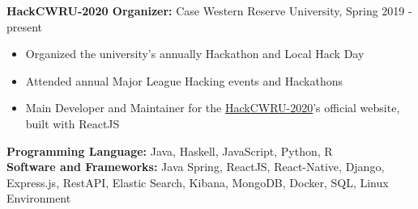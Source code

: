 \documentclass[a4paper,11pt]{article}
\begin{document}
\begin{flushleft}
	
	\textbf{HackCWRU-2020 Organizer: } Case Western Reserve University, Spring 2019 - 
	present
	\vspace{-\topsep}
	\begin{itemize}
		\setlength{\parskip}{2pt}
		\setlength{\itemsep}{0pt plus 1pt}
		\item Organized the university's annually Hackathon and Local Hack Day \\
		\item Attended annual Major League Hacking events and Hackathons
		\item Main Developer and Maintainer for the \href{https://hackcwru.info}{HackCWRU-2020}'s official website, built with ReactJS
	\end{itemize}
	
\centering{\noindent\makebox{\rule{8cm}{1.5pt}}}
\end{flushleft} 
\begin{flushleft}
	\textbf{Programming Language:} Java, Haskell, JavaScript, Python, R \\ 
	\doublespacing
	\textbf{Software and Frameworks:} Java Spring, ReactJS, React-Native, Django, Express.js, RestAPI, Elastic Search, Kibana, MongoDB, Docker, SQL, Linux Environment\\
	\vspace{-\topsep}
	
\end{flushleft}
\end{document}
